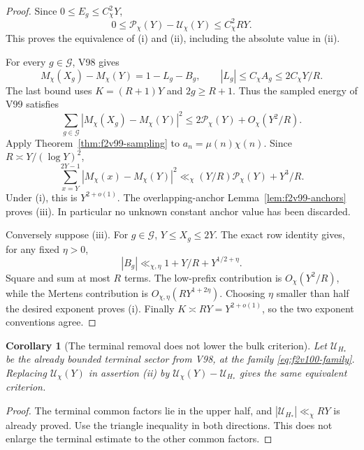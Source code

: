 \documentclass[11pt]{article}
\newtheorem{corollary}[theorem]{Corollary}
\theoremstyle{definition}
\theoremstyle{remark}
\begin{document}
\begin{proof}
Since \(0\le E_g\le C_\chi^2Y\),
\[
 0\le\mathcal P_\chi(Y)-\mathcal U_\chi(Y)
                         \le C_\chi^2RY.
\]
This proves the equivalence of (i) and (ii), including the absolute
value in (ii).

For every \(g\in\mathcal G\), V98 gives
\[
 M_\chi(X_g)-M_\chi(Y)=1-L_g-B_g,\qquad
 |L_g|\le C_\chi A_g\le 2C_\chi Y/R.
\]
The last bound uses \(K=(R+1)Y\) and \(2g\ge R+1\).
Thus the sampled energy of V99 satisfies
\begin{equation}
 \sum_{g\in\mathcal G}|M_\chi(X_g)-M_\chi(Y)|^2
             \le2\mathcal P_\chi(Y)+O_\chi(Y^2/R).
 \label{eq:f2v100-row-transfer}
\end{equation}
Apply Theorem~\ref{thm:f2v99-sampling} to
\(a_n=\mu(n)\chi(n)\).  Since \(R\asymp Y/(\log Y)^2\),
\begin{equation}
 \sum_{x=Y}^{2Y-1}|M_\chi(x)-M_\chi(Y)|^2
 \ll_\chi (Y/R)\mathcal P_\chi(Y)+Y^3/R.
 \label{eq:f2v100-anchored-transfer}
\end{equation}
Under (i), this is \(Y^{2+o(1)}\).  The overlapping-anchor
Lemma~\ref{lem:f2v99-anchors} proves (iii).  In particular no unknown
constant anchor value has been discarded.

Conversely suppose (iii).  For \(g\in\mathcal G\),
\(Y\le X_g\le2Y\).  The exact row identity gives, for any
fixed \(\eta>0\),
\[
 |B_g|\ll_{\chi,\eta}1+Y/R+Y^{1/2+\eta}.
\]
Square and sum at most \(R\) terms.  The low-prefix contribution
is \(O_\chi(Y^2/R)\), while the Mertens contribution is
\(O_{\chi,\eta}(RY^{1+2\eta})\).  Choosing \(\eta\) smaller
than half the desired exponent proves (i).  Finally
\(K\asymp RY=Y^{2+o(1)}\), so the two exponent conventions agree.
\end{proof}

\begin{corollary}[The terminal removal does not lower the bulk criterion]
\label{cor:f2v100-edge-removal}
Let \(\mathcal U_{H_*}\) be the already bounded terminal sector
from V98, at the family \eqref{eq:f2v100-family}.  Replacing
\(\mathcal U_\chi(Y)\) in assertion (ii) by
\(\mathcal U_\chi(Y)-\mathcal U_{H_*}\) gives the same equivalent
criterion.
\end{corollary}
\begin{proof}
The terminal common factors lie in the upper half, and
\(|\mathcal U_{H_*}|\ll_\chi RY\) is already proved.
Use the triangle inequality in both directions.  This does not
enlarge the terminal estimate to the other common factors.
\end{proof}
\end{document}
